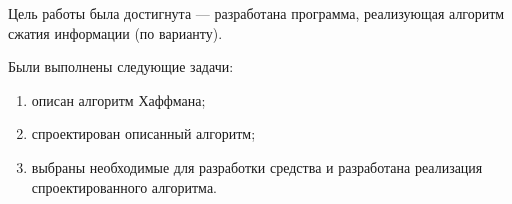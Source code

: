 
Цель работы была достигнута --- разработана программа, реализующая алгоритм сжатия информации (по варианту).

Были выполнены следующие задачи:
\begin{enumerate}
	\item описан алгоритм Хаффмана;
	\item спроектирован описанный алгоритм;
	\item выбраны необходимые для разработки средства и разработана реализация спроектированного алгоритма.
\end{enumerate}